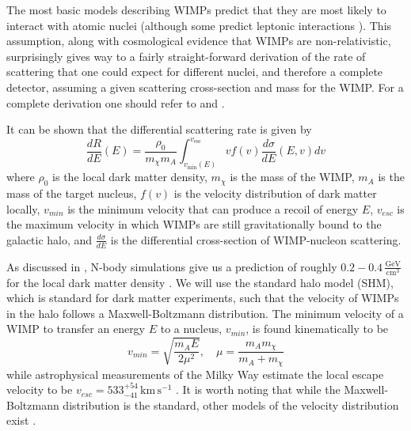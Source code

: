 The most basic models describing WIMPs predict that they are most likely to interact with atomic nuclei (although some predict leptonic interactions \cite{kopp2009dama}).  This assumption, along with cosmological evidence that WIMPs are non-relativistic, surprisingly gives way to a fairly straight-forward derivation of the rate of scattering that one could expect for different nuclei, and therefore a complete detector, assuming a given scattering cross-section and mass for the WIMP.  For a complete derivation one should refer to  and .

It can be shown that the differential scattering rate is given by \cite{undagoitia2015dark}
%
\begin{equation}
        \frac{dR}{dE}(E) = \frac{\rho_0}{m_{\chi} m_{A}} \int_{v_{\textrm{min}}(E)}^{v_{\textrm{esc}}} v f(v) \frac{d\sigma}{dE}(E, v) dv
\end{equation} 
%
where $\rho_0$ is the local dark matter density, $m_{\chi}$ is the mass of the WIMP, $m_{A}$ is the mass of the target nucleus, $f(v)$ is the velocity distribution of dark matter locally, $v_{min}$ is the minimum velocity that can produce a recoil of energy $E$, $v_{esc}$ is the maximum velocity in which WIMPs are still gravitationally bound to the galactic halo, and $\frac{d\sigma}{dE}$ is the differential cross-section of WIMP-nucleon scattering.  

As discussed in , N-body simulations give us a prediction of roughly $0.2 - 0.4 \, \frac{\textrm{GeV}}{\textrm{cm}^3}$ for the local dark matter density \cite{read2014local}.  We will use the standard halo model (SHM), which is standard for dark matter experiments,  such that the velocity of WIMPs in the halo follows a Maxwell-Boltzmann distribution.  The minimum velocity of a WIMP to transfer an energy $E$ to a nucleus, $v_{min}$, is found kinematically to be 
%
\begin{equation}
        v_{min} = \sqrt{\frac{m_A E}{2 \mu^2}},  \quad
        \mu = \frac{m_A m_{\chi}}{m_A + m_{\chi}}
\end{equation}
%
while astrophysical measurements of the Milky Way estimate the local escape velocity to be $v_{esc} = 533^{+54}_{-41} \, \textrm{km} \, \textrm{s}^{-1}$ \cite{piffl2014rave}.  It is worth noting that while the Maxwell-Boltzmann distribution is the standard, other models of the velocity distribution exist \cite{kuhlen2010dark}.

